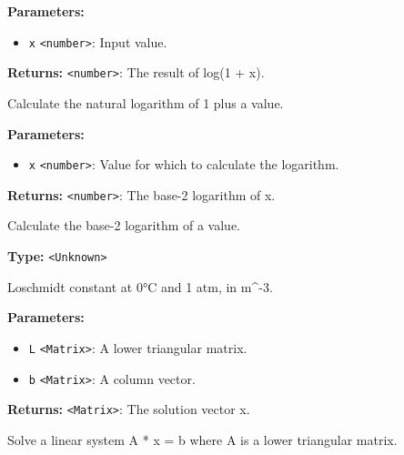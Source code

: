 \documentclass[12pt,a4paper]{article}
\begin{document}
\noindent \textbf{Parameters:}
\begin{itemize}
  \item \texttt{x} \texttt{<number>}: Input value.
\end{itemize}

\noindent \textbf{Returns:} \texttt{<number>}: The result of log(1 + x).

\noindent Calculate the natural logarithm of 1 plus a value.

\vspace{5mm}
\noindent {}


\noindent \textbf{Parameters:}
\begin{itemize}
  \item \texttt{x} \texttt{<number>}: Value for which to calculate the logarithm.
\end{itemize}

\noindent \textbf{Returns:} \texttt{<number>}: The base-2 logarithm of x.

\noindent Calculate the base-2 logarithm of a value.

\vspace{5mm}
\noindent {}\vspace{4mm}


\noindent \textbf{Type:} \texttt{<Unknown>}

\noindent Loschmidt constant at 0°C and 1 atm, in m\textasciicircum{}-3.

\vspace{5mm}
\noindent {}


\noindent \textbf{Parameters:}
\begin{itemize}
  \item \texttt{L} \texttt{<Matrix>}: A lower triangular matrix.
  \item \texttt{b} \texttt{<Matrix>}: A column vector.
\end{itemize}

\noindent \textbf{Returns:} \texttt{<Matrix>}: The solution vector x.

\noindent Solve a linear system A * x = b where A is a lower triangular matrix.
\end{document}
